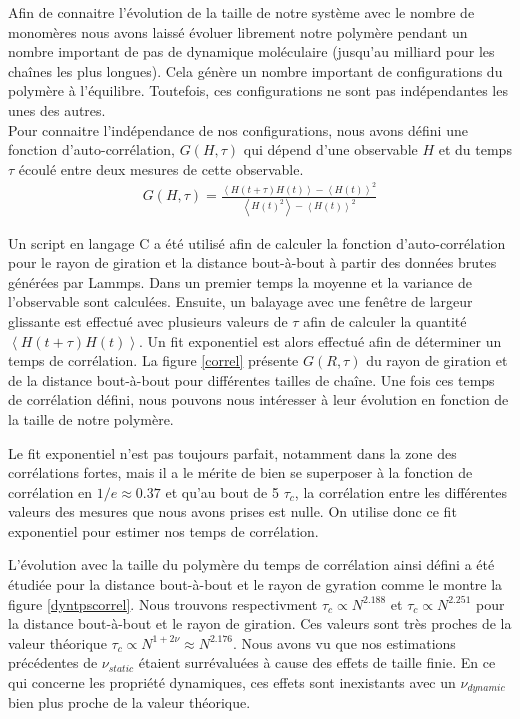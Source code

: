 Afin de connaitre l'évolution de la taille de notre système avec le nombre de monomères nous avons laissé évoluer librement notre polymère pendant un nombre important de pas de dynamique moléculaire (jusqu'au milliard pour les chaînes les plus longues). Cela génère un nombre important de configurations du polymère à l'équilibre. Toutefois, ces configurations ne sont pas indépendantes les unes des autres.\\

Pour connaitre l'indépendance de nos configurations, nous avons défini une fonction d'auto-corrélation, $G(H,\tau)$ qui dépend d'une observable $H$ et du temps $\tau$ écoulé entre deux mesures de cette observable.
\begin{eqnarray}
G(H,\tau)=\frac{\left<H(t+\tau)H(t)\right> -\left<H(t)\right>^2}{\left<H(t)^2\right> -\left<H(t)\right> ^2}
\end{eqnarray}

Un script en langage C a été utilisé afin de calculer la fonction d'auto-corrélation pour le rayon de giration et la distance bout-à-bout à partir des données brutes générées par Lammps. Dans un premier temps la moyenne et la variance de l'observable sont calculées. Ensuite, un balayage avec une fenêtre de largeur glissante est effectué avec plusieurs valeurs de $\tau$ afin de calculer la quantité $\left<H(t+\tau)H(t)\right>$. Un fit exponentiel est alors effectué afin de déterminer un temps de corrélation. La figure \ref{correl} présente $G(R,\tau)$ du rayon de giration et de la distance bout-à-bout pour différentes tailles de chaîne. Une fois ces temps de corrélation défini, nous pouvons nous intéresser à leur évolution en fonction de la taille de notre polymère.

Le fit exponentiel n'est pas toujours parfait, notamment dans la zone des corrélations fortes, mais il a le mérite de bien se superposer à la fonction de corrélation en $1/e \approx 0.37$ et qu'au bout de 5 $\tau_c$, la corrélation entre les différentes valeurs des mesures que nous avons prises est nulle. On utilise donc ce fit exponentiel pour estimer nos temps de corrélation. 

L'évolution avec la taille du polymère du temps de corrélation ainsi défini a été étudiée pour la distance bout-à-bout et le rayon de gyration comme le montre la figure \ref{dyntpscorrel}. Nous trouvons respectivment $\tau_c \propto N^{2.188}$ et $\tau_c \propto N^{2.251}$ pour la distance bout-à-bout et le rayon de giration. Ces valeurs sont très proches de la valeur théorique $\tau_c \propto N^{1+2\nu} \approx N^{2.176}$. Nous avons vu que nos estimations précédentes de $\nu_{static}$ étaient surrévaluées à cause des effets de taille finie. En ce qui concerne les propriété dynamiques, ces effets sont inexistants avec un $\nu_{dynamic}$ bien plus proche de la valeur théorique.

